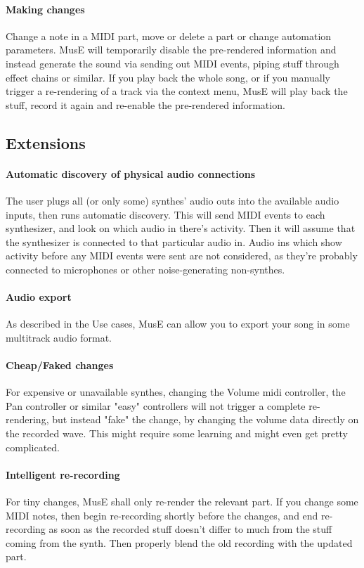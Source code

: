\documentclass[a4paper]{report}
\begin{document}
\paragraph{Making changes}
Change a note in a MIDI part, move or delete a part or change automation
parameters. MusE will temporarily disable the pre-rendered information
and instead generate the sound via sending out MIDI events, piping stuff
through effect chains or similar. If you play back the whole song, or
if you manually trigger a re-rendering of a track via the context menu,
MusE will play back the stuff, record it again and re-enable the
pre-rendered information.


\subsection{Extensions}
\paragraph{Automatic discovery of physical audio connections}
The user plugs all (or only some) synthes' audio outs into the available
audio inputs, then runs automatic discovery. This will send MIDI events
to each synthesizer, and look on which audio in there's activity. Then
it will assume that the synthesizer is connected to that particular
audio in. Audio ins which show activity before any MIDI events were
sent are not considered, as they're probably connected to microphones
or other noise-generating non-synthes.

\paragraph{Audio export}
As described in the Use cases, MusE can allow you to export your song
in some multitrack audio format.

\paragraph{Cheap/Faked changes}
For expensive or unavailable synthes, changing the Volume midi controller,
the Pan controller or similar "easy" controllers will not trigger a
complete re-rendering, but instead "fake" the change, by changing
the volume data directly on the recorded wave. This might require some
learning and might even get pretty complicated.

\paragraph{Intelligent re-recording}
For tiny changes, MusE shall only re-render the relevant part. If you
change some MIDI notes, then begin re-recording shortly before the
changes, and end re-recording as soon as the recorded stuff doesn't
differ to much from the stuff coming from the synth. Then properly
blend the old recording with the updated part.
\end{document}
